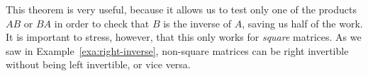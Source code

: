 This theorem is very useful, because it allows us to test only one of
the products $AB$ or $BA$ in order to check that $B$ is the inverse of
$A$, saving us half of the work. It is important to stress, however,
that this only works for {\em square} matrices. As we saw in
Example~\ref{exa:right-inverse}, non-square matrices can be right
invertible without being left invertible, or vice versa.

